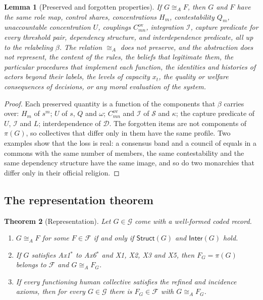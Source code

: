 \documentclass[11pt,letterpaper]{article}
\newtheorem{theorem}{Theorem}[section]
\newtheorem{lemma}[theorem]{Lemma}
\theoremstyle{definition}
\theoremstyle{remark}
\newcommand{\Integ}{\mathcal{I}}
\newcommand{\Struct}{\mathsf{Struct}}
\newcommand{\Inter}{\mathsf{Inter}}
\newcommand{\ov}{\mathrm{ov}}
\begin{document}
\begin{lemma}[Preserved and forgotten properties]
\label{lem:formalized-state:preserved}
If $G\cong_AF$, then $G$ and $F$ have the same role map, control shares, concentrations $H_m$, contestability $Q_m$, unaccountable concentration $U$, couplings $C^{\ov}_{mn}$, integration $\Integ$, capture predicate for every threshold pair, dependency structure, and interdependence predicate, all up to the relabeling $\beta$. The relation $\cong_A$ does not preserve, and the abstraction does not represent, the content of the rules, the beliefs that legitimate them, the particular procedures that implement each function, the identities and histories of actors beyond their labels, the levels of capacity $x_t$, the quality or welfare consequences of decisions, or any moral evaluation of the system.
\end{lemma}

\begin{proof}
Each preserved quantity is a function of the components that $\beta$ carries over: $H_m$ of $s^m$; $U$ of $s$, $Q$ and $\omega$; $C^{\ov}_{mn}$ and $\Integ$ of $\mathcal{S}$ and $\kappa$; the capture predicate of $U$, $\Integ$ and $L$; interdependence of $\mathcal{D}$. The forgotten items are not components of $\pi(G)$, so collectives that differ only in them have the same profile. Two examples show that the loss is real: a consensus band and a council of equals in a commons with the same number of members, the same contestability and the same dependency structure have the same image, and so do two monarchies that differ only in their official religion.
\end{proof}

\subsection{The representation theorem}

\begin{theorem}[Representation]
\label{thm:formalized-state:representation}
Let $G\in\mathcal{G}$ come with a well-formed coded record.
\begin{enumerate}[label=(\alph*)]
\item $G\cong_AF$ for some $F\in\mathcal{F}$ if and only if $\Struct(G)$ and $\Inter(G)$ hold.
\item If $G$ satisfies Ax1$^{*}$ to Ax6$^{*}$ and X1, X2, X3 and X5, then $F_G=\pi(G)$ belongs to $\mathcal{F}$ and $G\cong_AF_G$.
\item If every functioning human collective satisfies the refined and incidence axioms, then for every $G\in\mathcal{G}$ there is $F_G\in\mathcal{F}$ with $G\cong_AF_G$.
\end{enumerate}
\end{theorem}
\end{document}

